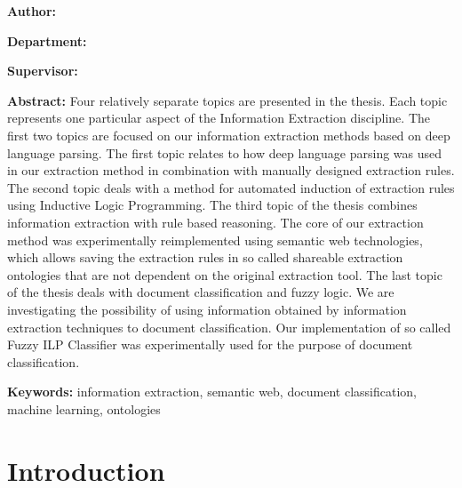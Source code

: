 \documentclass[12pt,a4paper,twoside,openright]{report}
\begin{document}
{\textbf{Author:}
\myauthor

\textbf{Department:}
\mydepartment

\textbf{Supervisor:}
\mysupervisor

\textbf{Abstract:}
Four relatively separate topics are presented in the thesis. Each topic represents one particular aspect of the Information Extraction discipline. The first two topics are focused on our information extraction methods based on deep language parsing. 
  The first topic relates to how deep language parsing was used in our extraction method in combination with manually designed extraction rules. 
  The second topic deals with a method for automated induction of extraction rules using Inductive Logic Programming. 
  The third topic of the thesis combines information extraction with rule based reasoning. The core of our extraction method was experimentally reimplemented using semantic web technologies, which allows saving the extraction rules in so called shareable extraction ontologies that are not dependent on the original extraction tool.
  The last topic of the thesis deals with document classification and fuzzy logic. We are investigating the possibility of using information obtained by information extraction techniques to document classification. Our implementation of so called Fuzzy ILP Classifier was experimentally used for the purpose of document classification.



\textbf{Keywords:} information extraction, semantic web, document classification, machine learning, ontologies

\vss}

\newpage


\openright


\tableofcontents



\chapter{Introduction}
\setcounter{page}{1}
\pagestyle{plain}
\end{document}
